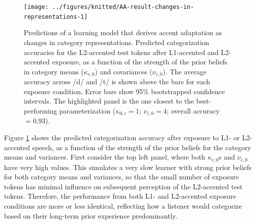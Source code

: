 \documentclass[
  11pt,
  man,floatsintext]{apa6}
\begin{document}
\begin{figure}

{\centering \texttt{[image: ../figures/knitted/AA-result-changes-in-representations-1]} 

}

\caption{Predictions of a learning model that derives accent adaptation as changes in category representations. Predicted categorization accuracies for the L2-accented test tokens after L1-accented and L2-accented exposure, as a function of the strength of the prior beliefs in category means (\(\kappa_{c,0}\)) and covariances (\(\nu_{c,0}\)). The average accuracy across /d/ and /t/ is shown above the bars for each exposure condition. Error bars show 95\% bootstrapped confidence intervals. The highlighted panel is the one closest to the best-performing parameterization (\(\kappa_{0,c} = 1\); \(\nu_{c,0}=4\); overall accuracy \(=0.93\)).}\label{fig:AA-result-changes-in-representations}
\end{figure}

Figure \ref{fig:AA-result-changes-in-representations} shows the predicted categorization accuracy after exposure to L1- or L2-accented speech, as a function of the strength of the prior beliefs for the category means and variances. First consider the top left panel, where both \(\kappa_{c,0}\)s and \(\nu_{c,0}\) have very high values. This simulates a very slow learner with strong prior beliefs for both category means and variances, so that the small number of exposure tokens has minimal influence on subsequent perception of the L2-accented test tokens. Therefore, the performance from both L1- and L2-accented exposure conditions are more or less identical, reflecting how a listener would categorize based on their long-term prior experience predominantly.
\end{document}
